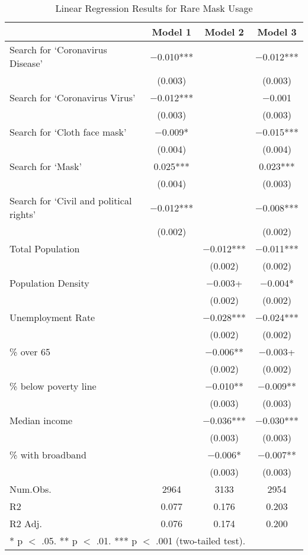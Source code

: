 \begin{table}[!h]

\caption{\label{tab:mask_analysis}Linear Regression Results for Rare Mask Usage}
\centering
\fontsize{8}{10}\selectfont

\begin{tabular}{lccc}
\toprule
  & Model 1 & Model 2 & Model 3\\
\midrule

Search for `Coronavirus Disease' & \num{-0.010}*** &  & \num{-0.012}***\\
 & (\num{0.003}) &  & \vphantom{1} (\num{0.003})\\
Search for `Coronavirus Virus' & \num{-0.012}*** &  & \num{-0.001}\\
 & (\num{0.003}) &  & (\num{0.003})\\
Search for `Cloth face mask' & \num{-0.009}* &  & \num{-0.015}***\\
 & (\num{0.004}) &  & (\num{0.004})\\
Search for `Mask' & \num{0.025}*** &  & \num{0.023}***\\
 & (\num{0.004}) &  & (\num{0.003})\\
Search for `Civil and political rights' & \num{-0.012}*** &  & \num{-0.008}***\\
 & (\num{0.002}) &  & (\num{0.002})\\
Total Population &  & \num{-0.012}*** & \num{-0.011}***\\
 &  & (\num{0.002}) & \vphantom{3} (\num{0.002})\\
Population Density &  & \num{-0.003}+ & \num{-0.004}*\\
 &  & (\num{0.002}) & \vphantom{2} (\num{0.002})\\
Unemployment Rate &  & \num{-0.028}*** & \num{-0.024}***\\
 &  & (\num{0.002}) & \vphantom{1} (\num{0.002})\\
\% over 65 &  & \num{-0.006}** & \num{-0.003}+\\
 &  & (\num{0.002}) & (\num{0.002})\\
\% below poverty line &  & \num{-0.010}** & \num{-0.009}**\\
 &  & (\num{0.003}) & \vphantom{2} (\num{0.003})\\
Median income &  & \num{-0.036}*** & \num{-0.030}***\\
 &  & (\num{0.003}) & \vphantom{1} (\num{0.003})\\
\% with broadband &  & \num{-0.006}* & \num{-0.007}**\\
 &  & (\num{0.003}) & (\num{0.003})\\
\midrule
Num.Obs. & \num{2964} & \num{3133} & \num{2954}\\
R2 & \num{0.077} & \num{0.176} & \num{0.203}\\
R2 Adj. & \num{0.076} & \num{0.174} & \num{0.200}\\
\bottomrule
\multicolumn{4}{l}{\rule{0pt}{1em}* p $<$ .05. ** p $<$ .01. *** p $<$ .001 (two-tailed test).}\\
\end{tabular}
\end{table}